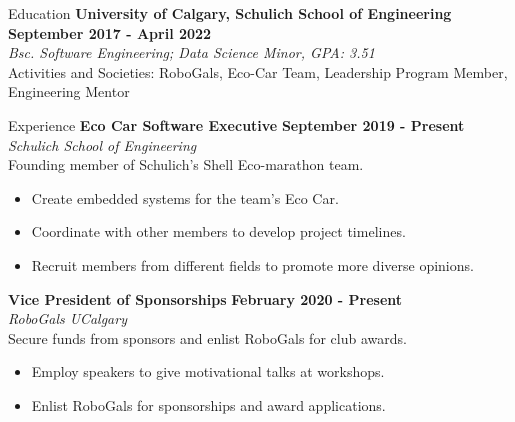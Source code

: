 \documentclass{resume} %
\begin{document}
\medskip
\begin{Entry}{Education}
{\bf University of Calgary, Schulich School of Engineering
} \hfill {\bf September 2017 - April 2022}
\\{\em Bsc. Software Engineering; Data Science Minor, GPA: 3.51}
\\ Activities and Societies: RoboGals, Eco-Car Team, Leadership Program Member, Engineering Mentor
\end{Entry}

 \medskip
\begin{Entry}{Experience}
{\bf Eco Car Software Executive } \hfill {\bf September 2019 - Present}
\\{\em Schulich School of Engineering}
\\ Founding member of Schulich's Shell Eco-marathon team.
\begin{itemize} \itemsep -5pt
  \item Create embedded systems for the team’s Eco Car.
  \item Coordinate with other members to develop project timelines.
  \item Recruit members from different fields to promote more diverse opinions.
\end{itemize}

{\bf Vice President of Sponsorships} \hfill {\bf February 2020 - Present}
\\{\em RoboGals UCalgary}
\\ Secure funds from sponsors and enlist RoboGals for club awards. 
\begin{itemize} \itemsep -5pt
  \item Employ speakers to give motivational talks at workshops.
  \item Enlist RoboGals for sponsorships and award applications.
\end{itemize}
\end{Entry}
\end{document}

